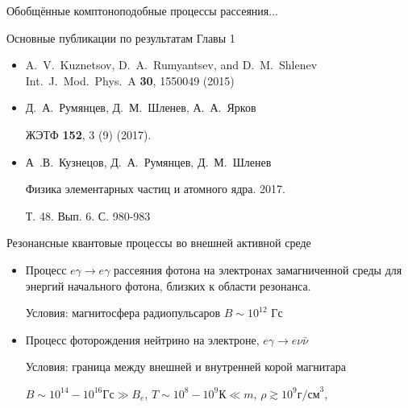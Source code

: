 \documentclass{beamer}
\begin{document}
\begin{frame}{Обобщённые комптоноподобные процессы рассеяния...}

\begin{center}
Основные публикации по результатам Главы 1
\end{center}
% 
\begin{itemize}
%
\item
   A.~V.~Kuznetsov, D.~A.~Rumyantsev, and  D.~M.~Shlenev 
   Int.~J.~Mod.~Phys.~A {\bf 30}, 1550049 (2015)
% 
\item
   Д.~А.~Румянцев, Д.~М.~Шленев, А.~А.~Ярков

   ЖЭТФ {\bf 152}, 3 (9) (2017).
%
\item
  А~.В.~Кузнецов, Д.~А.~Румянцев, Д.~М.~Шленев

  Физика элементарных частиц и атомного ядра. 2017.
 
  Т. 48. Вып. 6. С. 980-983
\end{itemize}
\end{frame}
\begin{frame}{Резонансные квантовые процессы во внешней активной среде}
\begin{itemize}
\item Процесс \alert{$e\gamma\to e \gamma$} рассеяния фотона на электронах замагниченной среды 
для энергий начального фотона, близких к области резонанса.
\vspace*{3mm}

\alert{Условия:} магнитосфера радиопульсаров $B \sim 10^{12}$ Гс
\vspace*{3mm}

\item Процесс фоторождения нейтрино на электроне, \alert{$e\gamma\to e\nu\bar\nu$}
\vspace*{3mm}

\alert{Условия:} граница между внешней и внутренней корой магнитара

$B\sim 10^{14}-10^{16} \text{Гс}\gg B_e$, $T\sim 10^8-10^9 \text{К}\ll m$, $\rho\gtrsim 10^9 \text{г/см}^3$, %
\end{itemize}
\end{frame}
\end{document}

